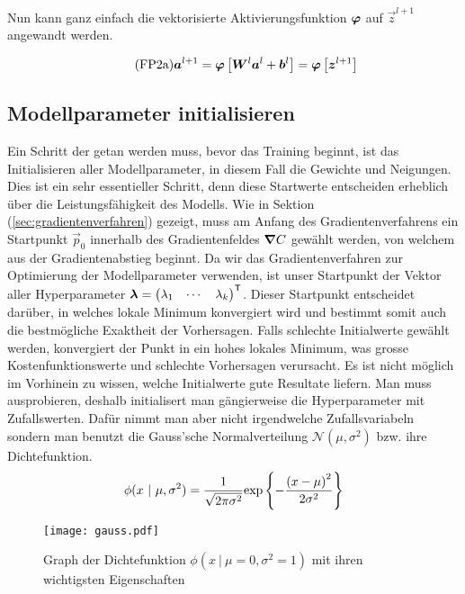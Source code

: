 Nun kann ganz einfach die vektorisierte Aktivierungsfunktion $\bm{\varphi}$ auf
$\vec{z}^{l+1}$ angewandt werden.

\begin{equation}\tag{FP2a}\label{eq:aktivierung_matrix}
  \bm{a}^{l+1} = \bm{\varphi} \left[\bm{W}^{l} \bm{a}^{l} + \bm{b}^{l} \right] = \bm{\varphi} \left[ \bm{z}^{l+1} \right]
\end{equation}

\para{}
\cite{Nielsen}

\subsection{Modellparameter initialisieren}\label{sec:parameter_initalisieren}
Ein Schritt der getan werden muss, bevor das Training beginnt, ist das
Initialisieren aller Modellparameter, in diesem Fall die Gewichte und Neigungen.
Dies ist ein sehr essentieller Schritt, denn diese Startwerte entscheiden
erheblich über die Leistungsfähigkeit des Modells.
\para{}
Wie in Sektion (\ref{sec:gradientenverfahren}) gezeigt, muss am Anfang des
Gradientenverfahrens ein Startpunkt $\vec{p}_0$ innerhalb des Gradientenfeldes
$\bm{\nabla}C$ gewählt werden, von welchem aus der Gradientenabstieg beginnt.
Da wir das Gradientenverfahren zur Optimierung der Modellparameter verwenden,
ist unser Startpunkt der Vektor aller Hyperparameter
$\bm{\lambda} = \begin{pmatrix} \lambda_1 & \cdots & \lambda_k \end{pmatrix}^{\mathsf{T}}$.
Dieser Startpunkt entscheidet darüber, in welches lokale Minimum konvergiert
wird und bestimmt somit auch die bestmögliche Exaktheit der Vorhersagen. Falls
schlechte Initialwerte gewählt werden, konvergiert der Punkt in ein hohes lokales
Minimum, was grosse Kostenfunktionswerte und schlechte Vorhersagen verursacht.
\para{}
Es ist nicht möglich im Vorhinein zu wissen, welche Initialwerte gute Resultate
liefern. Man muss ausprobieren, deshalb initialisert man gängierweise die
Hyperparameter mit Zufallswerten. Dafür nimmt man aber nicht irgendwelche
Zufallsvariabeln sondern man benutzt die Gauss'sche Normalverteilung
$\mathcal{N}(\mu,\sigma^2)$ bzw. ihre Dichtefunktion.
\[\ds \phi(x\ |\ \mu,\sigma^2) = \frac{1}{\sqrt{2\pi\sigma^2}} \text{exp} \left\{-\frac{{(x-\mu)}^2}{2\sigma^2}\right\} \]
\para{}

\begin{figure}[h!]
  \centering
  \texttt{[image: gauss.pdf]}
  \caption{Graph der Dichtefunktion $\phi(x\ |\ \mu=0,\sigma^2=1)$ mit ihren
    wichtigsten Eigenschaften}%
\end{figure}

